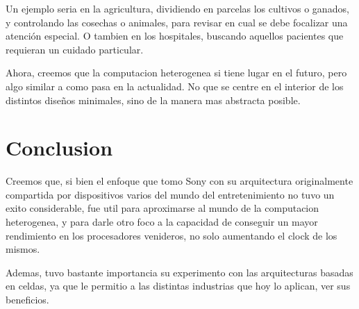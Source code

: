 \documentclass[10pt,compsoc]{IEEEtran}
\begin{document}
	Un ejemplo seria en la agricultura, dividiendo en parcelas los cultivos o ganados, y controlando las cosechas o animales, para revisar en cual se debe focalizar una atención especial. O tambien en los hospitales, buscando aquellos pacientes que requieran un cuidado particular.\newline
	
	Ahora, creemos que la computacion heterogenea si tiene lugar en el futuro, pero algo similar a como pasa en la actualidad. No que se centre en el interior de los distintos diseños minimales, sino de la manera mas abstracta posible.
	
	
	\section{Conclusion}
	\noindent Creemos que, si bien el enfoque que tomo Sony con su arquitectura originalmente compartida por dispositivos varios del mundo del entretenimiento no tuvo un exito considerable, fue util para aproximarse al mundo de la computacion heterogenea, y para darle otro foco a la capacidad de conseguir un mayor rendimiento en los procesadores venideros, no solo aumentando el clock de los mismos.\newline
	
	Ademas, tuvo bastante importancia su experimento con las arquitecturas basadas en celdas, ya que le permitio a las distintas industrias que hoy lo aplican, ver sus beneficios.
	
\end{document}
